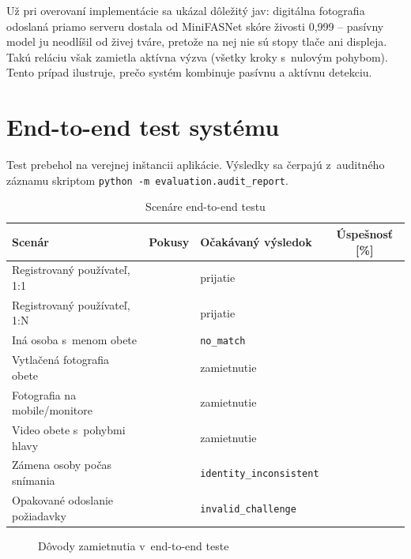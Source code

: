 
Už pri overovaní implementácie sa ukázal dôležitý jav: digitálna fotografia odoslaná
priamo serveru dostala od MiniFASNet skóre živosti 0,999 -- pasívny model ju neodlíšil
od živej tváre, pretože na nej nie sú stopy tlače ani displeja. Takú reláciu však
zamietla aktívna výzva (všetky kroky s~nulovým pohybom). Tento prípad ilustruje, prečo
systém kombinuje pasívnu a aktívnu detekciu.

\section{End-to-end test systému}

Test prebehol na verejnej inštancii aplikácie. Výsledky sa čerpajú z~auditného záznamu
skriptom \texttt{python -m evaluation.audit\_report}.

\begin{table}[H]
  \centering
  \caption{Scenáre end-to-end testu}
  \label{tab:e2e}
  \small
  \begin{tabularx}{\textwidth}{@{}X c l c@{}}
    \toprule
    Scenár & Pokusy & Očakávaný výsledok & Úspešnosť [\%] \\
    \midrule
    Registrovaný používateľ, 1:1 & \todo{} & prijatie & \todo{} \\
    Registrovaný používateľ, 1:N & \todo{} & prijatie & \todo{} \\
    Iná osoba s~menom obete & \todo{} & \texttt{no\_match} & \todo{} \\
    Vytlačená fotografia obete & \todo{} & zamietnutie & \todo{} \\
    Fotografia na mobile/monitore & \todo{} & zamietnutie & \todo{} \\
    Video obete s~pohybmi hlavy & \todo{} & zamietnutie & \todo{} \\
    Zámena osoby počas snímania & \todo{} & \texttt{identity\_inconsistent} & \todo{} \\
    Opakované odoslanie požiadavky & \todo{} & \texttt{invalid\_challenge} & \todo{} \\
    \bottomrule
  \end{tabularx}
\end{table}

\begin{figure}[H]
  \centering
  \caption{Dôvody zamietnutia v~end-to-end teste}
  \label{fig:reasons}
\end{figure}


